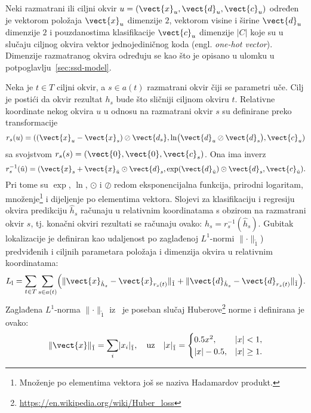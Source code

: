 \documentclass[utf8, diplomski, numeric, lmodern]{fer}
\begin{document}
Neki razmatrani ili ciljni okvir $u=(\vect{x}_u, \vect{d}_u, \vect{c}_u)$ određen je vektorom položaja $\vect{x}_u$ dimenzije $2$, vektorom visine i širine $\vect{d}_u$ dimenzije $2$ i pouzdanostima klasifikacije $\vect{c}_u$ dimenzije $\left|C\right|$ koje su u slučaju ciljnog okvira vektor jednojediničnog koda (engl. \emph{one-hot vector}). Dimenzije razmatranog okvira određuju se kao što je opisano u ulomku  u potpoglavlju~\ref{sec:ssd-model}.

Neka je $t\in T$ ciljni okvir, a $s\in a(t)$ razmatrani okvir čiji se parametri uče. Cilj je postići da okvir rezultat $h_s$ bude što sličniji ciljnom okviru $t$. Relativne koordinate nekog okvira $u$ u odnosu na razmatrani okvir $s$ su definirane preko transformacije
\begin{equation}
r_s(u) = ((\vect{x}_u-\vect{x}_{s})\oslash\vect{d_s}, \ln\left(\vect{d}_u\oslash\vect{d}_s\right), \vect{c}_u)
\end{equation}
sa svojstvom $r_s(s) = (\vect{0}, \vect{0}, \vect{c}_s)$. Ona ima inverz
\begin{equation}
r^{-1}_s(\hat{u}) = (\vect{x}_s+\vect{x}_{\hat{u}}\odot\vect{d}_s, \exp(\vect{d}_{\hat{u}})\odot\vect{d}_s, \vect{c}_{\hat{u}}).
\end{equation}
Pri tome su $\exp$, $\ln$, $\odot$ i $\oslash$ redom eksponencijalna funkcija, prirodni logaritam, množenje\footnote{Množenje po elementima vektora još se naziva Hadamardov produkt.} i dijeljenje po elementima vektora. Slojevi za klasifikaciju i regresiju okvira predikciju $\hat{h}_s$ računaju u relativnim koordinatama s obzirom na razmatrani okvir $s$, tj. konačni okviri rezultati se računaju ovako: $h_s = r^{-1}_s(\hat{h}_s)$. Gubitak lokalizacije je definiran kao udaljenost po zaglađenoj $L^1$-normi $\lVert \mathord{\cdot} \rVert_{\tilde{1}}$) predviđenih i ciljnih parametara položaja i dimenzija okvira u relativnim koordinatama: 
\begin{equation}
L_\mathrm{l} = \sum_{t \in T} \sum_{s \in a(t)} \left(
\lVert \vect{x}_{\hat{h}_s} - \vect{x}_{r_s(t)}
\rVert_{\tilde{1}}
+ \lVert \vect{d}_{\hat{h}_s} - \vect{d}_{r_s(t)}
\rVert_{\tilde{1}} \right).
\end{equation}
Zaglađena $L^1$-norma $\lVert \mathord{\cdot} \rVert_{\tilde{1}}$ iz~\cite{fastrcnn} je poseban slučaj Huberove\footnote{\url{https://en.wikipedia.org/wiki/Huber_loss}} norme i definirana je ovako:
\begin{equation}
\lVert \vect{x} \rVert_{\tilde{1}} = \sum_i \left|x_i\right|_{\tilde{1}},  \quad\mathrm{uz}\quad 
\left|x\right|_{\tilde{1}} = 
\begin{cases} 
0.5 x^2, 				& \left|x\right| < 1 , \\
\left|x\right| - 0.5,	& \left|x\right| \geq 1 . \\
\end{cases}
\end{equation}
\end{document}
